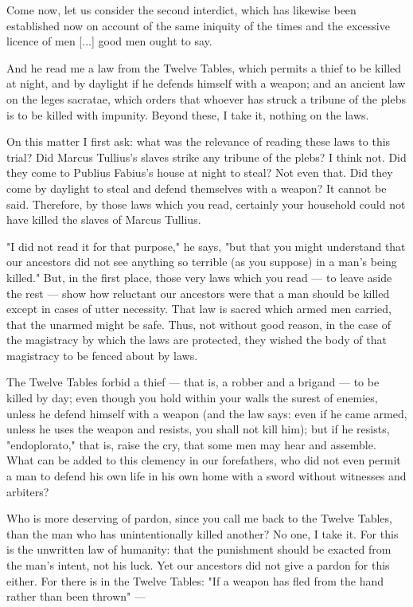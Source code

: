  Come now, let us consider the second interdict, which has likewise been established now on account of the same iniquity of the times and the excessive licence of men [...] good men ought to say.

 And he read me a law from the Twelve Tables, which permits a thief to be killed at night, and by daylight if he defends himself with a weapon; and an ancient law on the leges sacratae, which orders that whoever has struck a tribune of the plebs is to be killed with impunity. Beyond these, I take it, nothing on the laws.

 On this matter I first ask: what was the relevance of reading these laws to this trial? Did Marcus Tullius's slaves strike any tribune of the plebs? I think not. Did they come to Publius Fabius's house at night to steal? Not even that. Did they come by daylight to steal and defend themselves with a weapon? It cannot be said. Therefore, by those laws which you read, certainly your household could not have killed the slaves of Marcus Tullius.

 "I did not read it for that purpose," he says, "but that you might understand that our ancestors did not see anything so terrible (as you suppose) in a man's being killed." But, in the first place, those very laws which you read --- to leave aside the rest --- show how reluctant our ancestors were that a man should be killed except in cases of utter necessity. That law is sacred which armed men carried, that the unarmed might be safe. Thus, not without good reason, in the case of the magistracy by which the laws are protected, they wished the body of that magistracy to be fenced about by laws.

 The Twelve Tables forbid a thief --- that is, a robber and a brigand --- to be killed by day; even though you hold within your walls the surest of enemies, unless he defend himself with a weapon (and the law says: even if he came armed, unless he uses the weapon and resists, you shall not kill him); but if he resists, "endoplorato," that is, raise the cry, that some men may hear and assemble. What can be added to this clemency in our forefathers, who did not even permit a man to defend his own life in his own home with a sword without witnesses and arbiters?

 Who is more deserving of pardon, since you call me back to the Twelve Tables, than the man who has unintentionally killed another? No one, I take it. For this is the unwritten law of humanity: that the punishment should be exacted from the man's intent, not his luck. Yet our ancestors did not give a pardon for this either. For there is in the Twelve Tables: "If a weapon has fled from the hand rather than been thrown" ---

